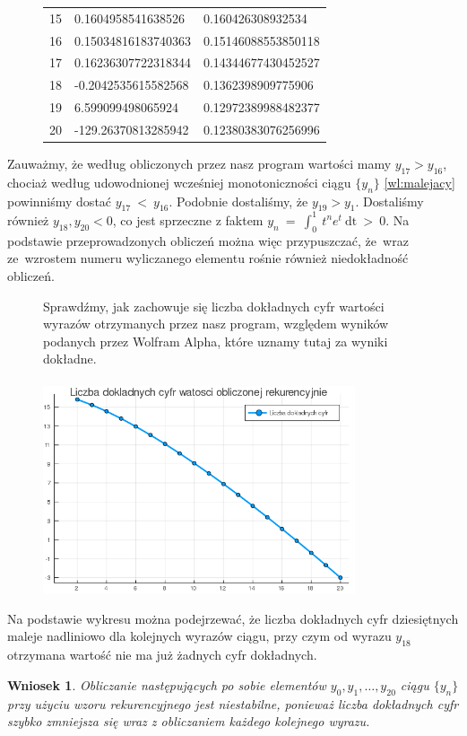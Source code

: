 \documentclass[11pt,wide]{article}
\newtheorem{wniosek}{Wniosek}
\begin{document}
\begin{figure}[h!]
\begin{center}
\begin{tabular}{ | c | l | l | }
	15 & {\color{green}0.1604}958541638526 & {\color{green}0.1604}26308932534\\ 
	16 & {\color{green}0.15}034816183740363 & {\color{green}0.15}146088553850118\\ 
	17 & {\color{green}0.1}6236307722318344 & {\color{green}0.1}4344677430452527\\ 
	18 & -0.2042535615582568 & 0.1362398909775906\\
	19 & 6.599099498065924 & 0.12972389988482377\\
	20 & -129.26370813285942 & 0.12380383076256996\\ 
	\hline
  \end{tabular}
\end{center}
\end{figure}
\clearpage 
Zauważmy, że według obliczonych przez nasz program wartości mamy \(y_{17} > y_{16}\), chociaż według udowodnionej wcześniej monotoniczności ciągu \(\{y_n\}\) \eqref{wl:malejacy} powinniśmy dostać \(y_{17}~<~y_{16}\). Podobnie dostaliśmy, że \(y_{19} > y_{1}\). Dostaliśmy również \(y_{18},y_{20} < 0\), co jest sprzeczne z faktem \(y_n~=~\int_0^1~t^n e^t~\mathrm{dt}~>~0\). Na podstawie przeprowadzonych obliczeń można więc przypuszczać, że~wraz ze~wzrostem numeru wyliczanego elementu rośnie również niedokładność obliczeń.


\begin{figure}[h!]
Sprawdźmy, jak zachowuje się liczba dokładnych cyfr wartości wyrazów otrzymanych przez nasz program, względem wyników podanych przez Wolfram Alpha, które uznamy tutaj za wyniki dokładne.\\ \\
	\centering
	\includegraphics[width=0.82\textwidth]{plot}
\end{figure}
Na podstawie wykresu można podejrzewać, że liczba dokładnych cyfr dziesiętnych maleje nadliniowo dla kolejnych wyrazów ciągu, przy czym od wyrazu \(y_{18}\) otrzymana wartość nie ma już żadnych cyfr dokładnych.
\begin{wniosek}
Obliczanie następujących po sobie elementów \(y_0, y_1, \dots, y_{20}\) ciągu \(\{y_n\}\) przy użyciu wzoru rekurencyjnego jest niestabilne, ponieważ liczba dokładnych cyfr szybko zmniejsza się wraz z obliczaniem każdego kolejnego wyrazu.
\end{wniosek}
\end{document}
